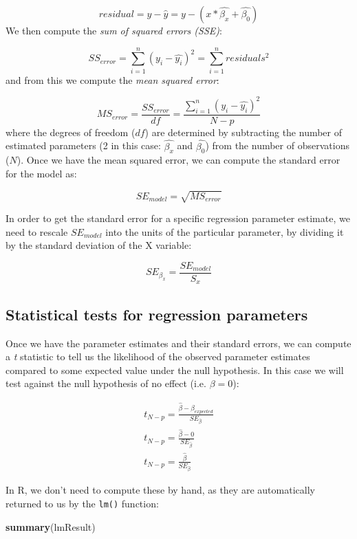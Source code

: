 \documentclass[]{book}
\newenvironment{Shaded}{\begin{snugshade}}{\end{snugshade}}
\newcommand{\KeywordTok}[1]{\textcolor[rgb]{0.13,0.29,0.53}{\textbf{#1}}}
\newcommand{\NormalTok}[1]{#1}
\theoremstyle{definition}
\theoremstyle{definition}
\theoremstyle{definition}
\theoremstyle{remark}
\begin{document}
\[
residual = y - \hat{y} = y - (x*\hat{\beta_x} + \hat{\beta_0})
\] We then compute the \emph{sum of squared errors (SSE)}:

\[
SS_{error} = \sum_{i=1}^n{(y_i - \hat{y_i})^2} = \sum_{i=1}^n{residuals^2}
\] and from this we compute the \emph{mean squared error}:

\[
MS_{error} = \frac{SS_{error}}{df} = \frac{\sum_{i=1}^n{(y_i - \hat{y_i})^2} }{N - p}
\] where the degrees of freedom (\(df\)) are determined by subtracting
the number of estimated parameters (2 in this case: \(\hat{\beta_x}\)
and \(\hat{\beta_0}\)) from the number of observations (\(N\)). Once we
have the mean squared error, we can compute the standard error for the
model as:

\[
SE_{model} = \sqrt{MS_{error}}
\]

In order to get the standard error for a specific regression parameter
estimate, we need to rescale \(SE_{model}\) into the units of the
particular parameter, by dividing it by the standard deviation of the X
variable:

\[
SE_{\beta_x} = \frac{SE_{model}}{S_x}
\]

\subsection{Statistical tests for regression
parameters}\label{statistical-tests-for-regression-parameters}

Once we have the parameter estimates and their standard errors, we can
compute a \emph{t} statistic to tell us the likelihood of the observed
parameter estimates compared to some expected value under the null
hypothesis. In this case we will test against the null hypothesis of no
effect (i.e. \(\beta=0\)):

\[
\begin{array}{c}
t_{N - p} = \frac{\hat{\beta} - \beta_{expected}}{SE_{\hat{\beta}}}\\
t_{N - p} = \frac{\hat{\beta} - 0}{SE_{\hat{\beta}}}\\
t_{N - p} = \frac{\hat{\beta} }{SE_{\hat{\beta}}}
\end{array}
\]

In R, we don't need to compute these by hand, as they are automatically
returned to us by the \texttt{lm()} function:

\begin{Shaded}
\begin{Highlighting}[]
\KeywordTok{summary}\NormalTok{(lmResult)}
\end{Highlighting}
\end{Shaded}
\end{document}
